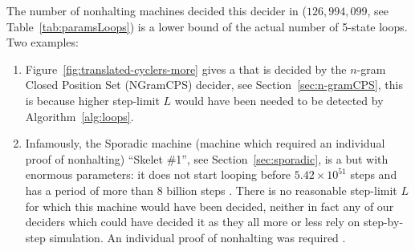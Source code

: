 The number of nonhalting machines decided this decider in \CoqBB (\ie $126{,}994{,}099$, see Table~\ref{tab:paramsLoops}) is a lower bound of the actual number of 5-state loops. Two examples:

\begin{enumerate}
  \item Figure~\ref{fig:translated-cyclers-more} gives a \TC that is decided by the $n$-gram Closed Position Set (NGramCPS) decider, see Section~\ref{sec:n-gramCPS}, this is because higher step-limit $L$ would have been needed to be detected by Algorithm~\ref{alg:loops}.
  \item Infamously, the Sporadic machine (\ie machine which required an individual proof of nonhalting) ``Skelet \#1'', see Section~\ref{sec:sporadic}, is a \TC but with enormous parameters: it does not start looping before $5.42 \times 10^{51}$ steps and has a period of more than 8 billion steps \cite{ShawnSkelet1}. There is no reasonable step-limit $L$ for which this machine would have been decided, neither in fact any of our deciders which could have decided it as they all more or less rely on step-by-step simulation. An individual proof of nonhalting was required \cite{busycoq}.
\end{enumerate}

